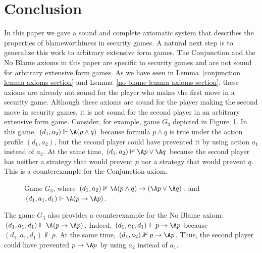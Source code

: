 \documentclass[letterpaper]{article}
\begin{document}
\section{Conclusion}

In this paper we gave a sound and complete axiomatic system that describes the properties of blameworthiness in security games. A natural next step is to generalize this work to arbitrary extensive form games. The Conjunction and the No Blame axioms in this paper are specific to security games and are not sound for arbitrary extensive form games. As we have seen in Lemma~\ref{conjunction lemma axioms section} and Lemma~\ref{no blame lemma axioms section}, these axioms are already not sound for the player who makes the first move in a security game. Although these axioms are sound for the player making the second move in security games, it is not sound for the second player in an arbitrary extensive form game. Consider, for example, game $G_3$ depicted in Figure~\ref{conclusion figure}. In this game, $(d_1,a_2)\Vdash \A(p\wedge q)$ because formula $p\wedge q$ is true under the action profile $(d_1,a_2)$, but the second player could have prevented it by using action $a_1$ instead of $a_2$. At the same time,  $(d_1,a_2)\nVdash \A p\vee  \A q$ because the second player has neither a strategy that would prevent $p$ nor a strategy that would prevent $q$. This is a counterexample for the Conjunction axiom.
\begin{figure}[ht]\label{conclusion figure}
\begin{center}
\vspace{0mm}
\vspace{0mm}
\caption{Game $G_3$, where $(d_1,a_2)\nVdash \A(p\wedge q)\to(\A p\vee\A q)$, and $(d_1,a_1,d_1)\Vdash \A(p\to\A p)$.
}\label{conclusion figure}
\end{center}
\end{figure}
The game $G_3$ also provides a counterexample for the No Blame axiom: $(d_1,a_1,d_1)\Vdash \A(p\to\A p)$. Indeed, $(d_1,a_1,d_1)\Vdash p\to\A p$ because $(d_1,a_1,d_1)\nVdash p$. At the same time, $(d_1,a_2)\nVdash p\to\A p$. Thus, the second player could have prevented $p\to\A p$ by using $a_2$ instead of $a_1$.
\end{document}
